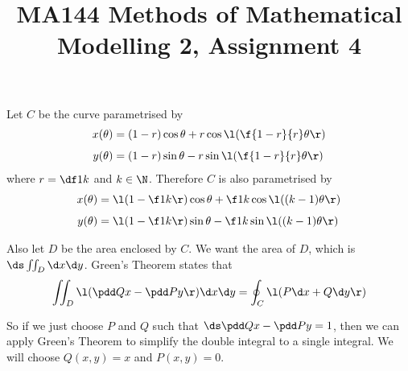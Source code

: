 \documentclass[a4paper]{article}
\title{MA144 Methods of Mathematical Modelling 2, Assignment 4}
\begin{document}
\maketitle

\setlength{\parindent}{0em}
\setlength{\parskip}{1em}


Let $C$ be the curve parametrised by \begin{align*}
x(\theta) &= (1-r) \cos \theta + r \cos \l( \f{1-r}{r} \theta \r) \\[1ex]
y(\theta) &= (1-r) \sin \theta - r \sin \l( \f{1-r}{r} \theta \r)
\end{align*}
where $r = \df1k$ and $k \in \N$.
Therefore $C$ is also parametrised by \begin{align*}
x(\theta) &= \l( 1 - \f1k \r) \cos \theta + \f1k \cos \l( (k-1) \theta \r) \\[1ex]
y(\theta) &= \l( 1 - \f1k \r) \sin \theta - \f1k \sin \l( (k-1) \theta \r)
\end{align*}

Also let $D$ be the area enclosed by $C$. We want the area of $D$, which is $\ds \iint_D \d x \d y$. Green's Theorem states that $$\iint_D \l( \pdd Qx - \pdd Py \r) \d x \d y = \oint_C \l( P \d x + Q \d y \r)$$

So if we just choose $P$ and $Q$ such that $\ds \pdd Qx - \pdd Py = 1$, then we can apply Green's Theorem to simplify the double integral to a single integral. We will choose $Q(x, y) = x$ and $P(x, y) = 0$.
\end{document}
